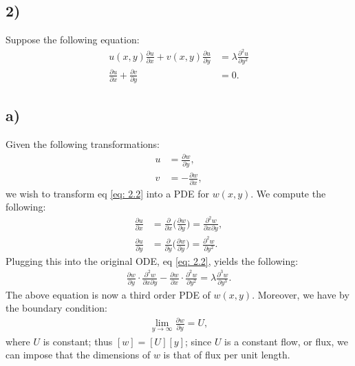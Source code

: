\documentclass{article}
\begin{document}
\begin{comment}
\begin{align*}
    \text{$r = 1$ gives:}\quad  a_{n+2} &= -\frac{a_n}{2(n+3)}\\
    a_2 &= -\frac{a_0}{6}\\
    a_4 &= -\frac{a_2}{10} = \frac{a_0}{60}\\
    a_6 &= -\frac{a_4}{14} = -\frac{a_0}{840}\\
    a_{n+2} &= -1\cdot \frac{a_n}{2(n+3)} = 1\frac{a_{n-2}}{2^2(n+3)(n+1)} = \frac{a_{n-4}}{2^3(n+3)(n+1)(n-1)}\\
    a_{n+2} &= \Big(\frac{-1}{2}\Big)^{n+1}\frac{a_0}{2^{n-1}(n+3)!!},\\
    a_{2n} &= (-1)^{n+1} \frac{a_0}{(2n+1)!!}\\
\end{align*}
\end{comment}

\subsection*{2)}
Suppose the following equation:
\begin{align}
    u(x,y)\frac{\partial u}{\partial x} + v(x,y)\frac{\partial u}{\partial y} &= \lambda\frac{\partial^2 u}{\partial y ^2}\nonumber\\
    \frac{\partial u}{\partial x} + \frac{\partial v}{\partial y} &= 0.\label{eq: 2.2}
\end{align}
\subsection*{a)}
Given the following transformations:
\begin{align*}
    u &= \frac{\partial w}{\partial y},\\
    v &= -\frac{\partial w}{\partial x},
\end{align*}we wish to transform eq \eqref{eq: 2.2} into a PDE for $w(x,y)$. We compute the following:
\begin{align*}
    \frac{\partial u}{\partial x} &= \frac{\partial }{\partial x}\Big(\frac{\partial w}{\partial y}\Big)=\frac{\partial^2 w}{\partial x \partial y},\\
    \frac{\partial u}{\partial y} &= \frac{\partial }{\partial y}\Big(\frac{\partial w}{\partial y}\Big)=\frac{\partial^2 w}{\partial y^2}.
\end{align*}Plugging this into the original ODE, eq \eqref{eq: 2.2}, yields the following:
\begin{align*}
    \frac{\partial w}{\partial y}\cdot \frac{\partial^2 w}{\partial x\partial y} - \frac{\partial w}{\partial x} \cdot \frac{\partial^2w}{\partial y^2} = \lambda \frac{\partial^3 w}{\partial y^3}.
\end{align*}The above equation is now a third order PDE of $w(x,y)$. Moreover, we have by the boundary condition:
\begin{align*}
    \lim_{y\to \infty} \frac{\partial w}{\partial y} = U,
\end{align*}where $U$ is constant; thus $[w] = [U][y]$; since $U$ is a constant flow, or flux, we can impose that the dimensions of $w$ is that of flux per unit length.
\end{document}
